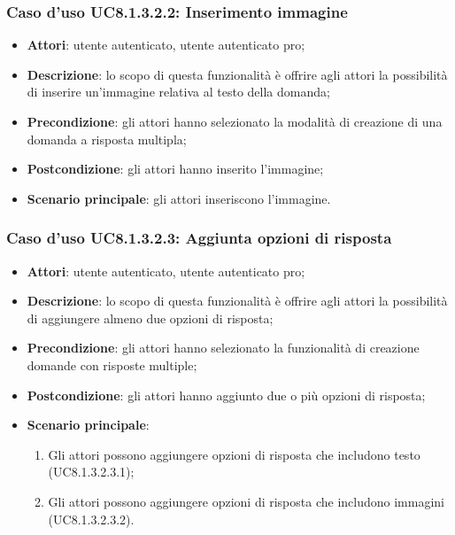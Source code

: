 \subsubsection{Caso d'uso UC8.1.3.2.2: Inserimento immagine}
	\begin{itemize}
		\item
			\textbf{Attori}: utente autenticato, utente autenticato pro;
		\item		
			\textbf{Descrizione}: lo scopo di questa funzionalità è offrire agli attori la possibilità di inserire un'immagine relativa al testo della domanda;
		\item
			\textbf{Precondizione}: gli attori hanno selezionato la modalità di creazione di una domanda a risposta multipla; 
		\item
			\textbf{Postcondizione}: gli attori hanno inserito l'immagine;
		\item
			\textbf{Scenario principale}: gli attori inseriscono l'immagine. 	
	\end{itemize}
	
	
\subsubsection{Caso d'uso UC8.1.3.2.3: Aggiunta opzioni di risposta}
	\begin{itemize}
		\item
			\textbf{Attori}: utente autenticato, utente autenticato pro;
		\item		
			\textbf{Descrizione}: lo scopo di questa funzionalità è offrire agli attori la possibilità di aggiungere almeno due opzioni di risposta;
		\item
			\textbf{Precondizione}: gli attori hanno selezionato la funzionalità di creazione domande con risposte multiple; 
		\item
			\textbf{Postcondizione}: gli attori hanno aggiunto due o più opzioni di risposta;
		\item
			\textbf{Scenario principale}:
	       		\begin{enumerate}
	       			\item
	       			Gli attori possono aggiungere opzioni di risposta che includono testo (UC8.1.3.2.3.1);
					\item
					Gli attori possono aggiungere opzioni di risposta che includono immagini (UC8.1.3.2.3.2).
	 			\end{enumerate}
	\end{itemize}	
	
